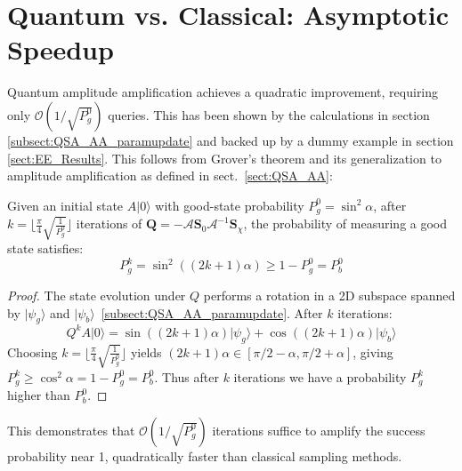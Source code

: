\documentclass[encoding=utf8,british]{tumphthesis}
\begin{document}
    \section{Quantum vs. Classical: Asymptotic Speedup}
    \label{sect:Benchmark_asymptotic}
        Quantum amplitude amplification achieves a quadratic improvement, requiring only $\mathcal{O}(1/\sqrt{P_g^0})$ queries. This has been shown by 
        the calculations in section \ref{subsect:QSA_AA_paramupdate} and backed up by a dummy example in section \ref{sect:EE_Results}.
        This follows from Grover's theorem and its generalization to amplitude amplification as defined in sect.~\ref{sect:QSA_AA}:
        \begin{theorem}[Brassard et al. 2000]
        Given an initial state $A|0\rangle$ with good-state probability $P_g^0 = \sin^2\alpha$, after $k = \lfloor \frac{\pi}{4}\sqrt{\frac{1}{P_g^0}} \rfloor$ 
        iterations of $\mathbf{Q} = -\mathcal{A} \mathbf{S}_0 \mathcal{A}^{-1} \mathbf{S}_\chi$, the probability of measuring a good state 
        satisfies:
        \begin{equation}
        P_g^k = \sin^2((2k+1)\alpha) \geq 1 - P_g^0 = P_b^0
        \end{equation}
        \end{theorem}

        \begin{proof}
        The state evolution under $Q$ performs a rotation in a 2D subspace spanned by $|\psi_g\rangle$ and $|\psi_b\rangle$~\ref{subsect:QSA_AA_paramupdate}. 
        After $k$ iterations:
        \begin{equation*}
        Q^k A|0\rangle = \sin((2k+1)\alpha)|\psi_g\rangle + \cos((2k+1)\alpha)|\psi_b\rangle
        \end{equation*}
        Choosing $k = \lfloor \frac{\pi}{4}\sqrt{\frac{1}{P_g^0}} \rfloor$ yields $(2k+1)\alpha \in [\pi/2 - \alpha, \pi/2 + \alpha]$, giving $P_g^k \geq \cos^2\alpha = 1 - P_g^0 = P_b^0$.
        Thus after $k$ iterations we have a probability $P_g^k$ higher than $P_b^0$.
        \end{proof}

        This demonstrates that $\mathcal{O}(1/\sqrt{P_g^0})$ iterations suffice to amplify the success probability near 1, quadratically 
        faster than classical sampling methods.
\end{document}
